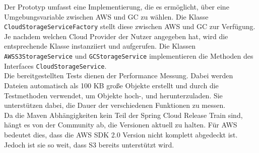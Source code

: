 Der Prototyp umfasst eine Implementierung, die es ermöglicht, über eine Umgebungsvariable zwischen AWS und GC zu wählen. Die Klasse \verb|CloudStorageServiceFactory| stellt diese zwischen AWS und GC zur Verfügung. Je nachdem welchen Cloud Provider der Nutzer angegeben hat, wird die entsprechende Klasse instanziiert und aufgerufen. Die Klassen \verb|AWSS3StorageService| und \verb|GCStorageService| implementieren die Methoden des Interfaces \verb|CloudStorageService|.\\

Die bereitgestellten Tests dienen der Performance Messung. Dabei werden Dateien automatisch als 100 KB große Objekte erstellt und durch die Testmethoden verwendet, um Objekte hoch-, und herunterzuladen. Sie unterstützen dabei, die Dauer der verschiedenen Funktionen zu messen.\\

Da die Maven Abhängigkeiten kein Teil der Spring Cloud Release Train sind, hängt es von der Community ab, die Versionen aktuell zu halten. Für AWS bedeutet dies, dass die AWS SDK 2.0 Version nicht komplett abgedeckt ist. Jedoch ist sie so weit, dass S3 bereits unterstützt wird. 